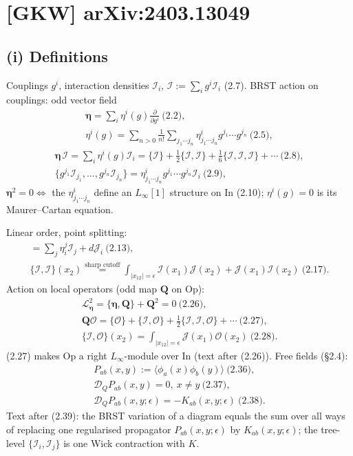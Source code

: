 \documentclass[10pt]{article}
\begin{document}
\section{[GKW] arXiv:2403.13049}
\subsection{(i) Definitions}
Couplings $g^i$, interaction densities $\mathcal I_i$, $\mathcal I:=\sum_ig^i\mathcal I_i$ (2.7). BRST action on couplings: odd vector field
\begin{gather*}
\boldsymbol\eta=\sum_i\eta^i(g)\frac{\partial}{\partial g^i}\ \text{(2.2)},\\
\eta^i(g)=\sum_{n>0}\frac1{n!}\sum_{j_1\cdots j_n}\eta^i_{j_1\cdots j_n}g^{j_1}\cdots g^{j_n}\ \text{(2.5)},
\end{gather*}
\begin{gather*}
\boldsymbol\eta\,\mathcal I=\sum_i\eta^i(g)\mathcal I_i=\{\mathcal I\}+\tfrac12\{\mathcal I,\mathcal I\}+\tfrac16\{\mathcal I,\mathcal I,\mathcal I\}+\cdots\ \text{(2.8)},\\
\{g^{j_1}\mathcal I_{j_1},\dots,g^{j_n}\mathcal I_{j_n}\}=\eta^i_{j_1\cdots j_n}g^{j_1}\cdots g^{j_n}\mathcal I_i\ \text{(2.9)},
\end{gather*}
$\boldsymbol\eta^2=0\Leftrightarrow$ the $\eta^i_{j_1\cdots j_n}$ define an $L_\infty[1]$ structure on In (2.10); $\eta^i(g)=0$ is its Maurer--Cartan equation.

Linear order, point splitting:
\begin{gather*}
[Q,\mathcal I_i]=\sum_j\eta^j_i\mathcal I_j+d\mathcal J_i\ \text{(2.13)},\\
\{\mathcal I,\mathcal I\}(x_2)\overset{\text{sharp cutoff}}{=}\int_{|x_{12}|=\epsilon}\mathcal I(x_1)\mathcal J(x_2)+\mathcal J(x_1)\mathcal I(x_2)\ \text{(2.17)}.
\end{gather*}
Action on local operators (odd map $\mathbf Q$ on Op):
\begin{gather*}
\mathcal L_{\boldsymbol\eta}^2=\{\boldsymbol\eta,\mathbf Q\}+\mathbf Q^2=0\ \text{(2.26)},\\
\mathbf Q\mathcal O=\{\mathcal O\}+\{\mathcal I,\mathcal O\}+\tfrac12\{\mathcal I,\mathcal I,\mathcal O\}+\cdots\ \text{(2.27)},\\
\{\mathcal I,\mathcal O\}(x_2)=\int_{|x_{12}|=\epsilon}\mathcal J(x_1)\mathcal O(x_2)\ \text{(2.28)}.
\end{gather*}
(2.27) makes Op a right $L_\infty$-module over In (text after (2.26)). Free fields (\S2.4):
\begin{gather*}
P_{ab}(x,y):=\langle\phi_a(x)\phi_b(y)\rangle\ \text{(2.36)},\\
\mathscr D_QP_{ab}(x,y)=0,\ x\neq y\ \text{(2.37)},\\
\mathscr D_QP_{ab}(x,y;\epsilon)=-K_{ab}(x,y;\epsilon)\ \text{(2.38)}.
\end{gather*}
Text after (2.39): the BRST variation of a diagram equals the sum over all ways of replacing one regularised propagator $P_{ab}(x,y;\epsilon)$ by $K_{ab}(x,y;\epsilon)$; the tree-level $\{\mathcal I_i,\mathcal I_j\}$ is one Wick contraction with $K$.
\end{document}
